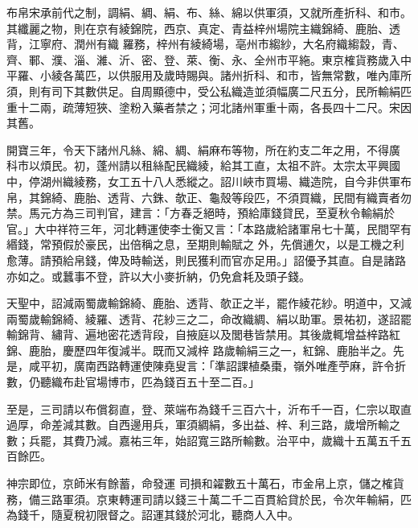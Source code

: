 
\begin{pinyinscope}

 布帛宋承前代之制，調絹、綢、絹、布、絲、綿以供軍須，又就所產折科、和市。其纖麗之物，則在京有綾錦院，西京、真定、青益梓州場院主織錦綺、鹿胎、透背，江寧府、潤州有織
 羅務，梓州有綾綺場，亳州市縐紗，大名府織縐縠，青、齊、鄆、濮、淄、濰、沂、密、登、萊、衡、永、全州市平絁。東京榷貨務歲入中平羅、小綾各萬匹，以供服用及歲時賜與。諸州折科、和市，皆無常數，唯內庫所須，則有司下其數供足。自周顯德中，受公私織造並須幅廣二尺五分，民所輸絹匹重十二兩，疏薄短狹、塗粉入藥者禁之；河北諸州軍重十兩，各長四十二尺。宋因其舊。



 開寶三年，令天下諸州凡絲、綿、綢、絹麻布等物，所在約支二年之用，不得廣
 科市以煩民。初，蓬州請以租絲配民織綾，給其工直，太祖不許。太宗太平興國中，停湖州織綾務，女工五十八人悉縱之。詔川峽市買場、織造院，自今非供軍布帛，其錦綺、鹿胎、透背、六銖、欹正、龜殼等段匹，不須買織，民間有織賣者勿禁。馬元方為三司判官，建言：「方春乏絕時，預給庫錢貸民，至夏秋令輸絹於官。」大中祥符三年，河北轉運使李士衡又言：「本路歲給諸軍帛七十萬，民間罕有緡錢，常預假於豪民，出倍稱之息，至期則輸賦之
 外，先償逋欠，以是工機之利愈薄。請預給帛錢，俾及時輸送，則民獲利而官亦足用。」詔優予其直。自是諸路亦如之。或蠶事不登，許以大小麥折納，仍免倉耗及頭子錢。



 天聖中，詔減兩蜀歲輸錦綺、鹿胎、透背、欹正之半，罷作綾花紗。明道中，又減兩蜀歲輸錦綺、綾羅、透背、花紗三之二，命改織綢、絹以助軍。景祐初，遂詔罷輸錦背、繡背、遍地密花透背段，自掖庭以及閭巷皆禁用。其後歲輒增益梓路紅錦、鹿胎，慶歷四年復減半。既而又減梓
 路歲輸絹三之一，紅錦、鹿胎半之。先是，咸平初，廣南西路轉運使陳堯叟言：「準詔課植桑棗，嶺外唯產苧麻，許令折數，仍聽織布赴官場博市，匹為錢百五十至二百。」



 至是，三司請以布償芻直，登、萊端布為錢千三百六十，沂布千一百，仁宗以取直過厚，命差減其數。自西邊用兵，軍須綢絹，多出益、梓、利三路，歲增所輸之數；兵罷，其費乃減。嘉祐三年，始詔寬三路所輸數。治平中，歲織十五萬五千五百餘匹。



 神宗即位，京師米有餘蓄，命發運
 司損和糴數五十萬石，市金帛上京，儲之榷貨務，備三路軍須。京東轉運司請以錢三十萬二千二百貫給貸於民，令次年輸絹，匹為錢千，隨夏稅初限督之。詔運其錢於河北，聽商人入中。




\end{pinyinscope}
